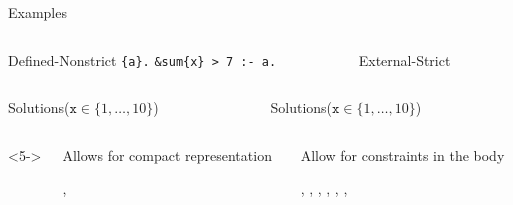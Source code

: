 \documentclass[t,fleqn]{beamer}
\begin{document}
\begin{frame}{Examples}
\vspace{-\baselineskip}%
\begin{columns}[t]
\begin{column}[t]{0.48\linewidth}
\begin{block}{Defined-Nonstrict}
\texttt{\{a\}.}\newline
\texttt{\&sum\{x\} > 7 :- a.}
\end{block}
\end{column}
\begin{column}[t]{0.48\linewidth}
\begin{block}{External-Strict}
\end{block}
\end{column}
\end{columns}
%
\begin{columns}
\begin{column}[t]{0.48\linewidth}
\begin{block}{Solutions\hfill\small ($\mathtt{x}\in\{1,\dots,10\}$)}
%
\end{block}
\end{column}
\begin{column}[t]{0.48\linewidth}
\begin{block}{Solutions\hfill\small ($\mathtt{x}\in\{1,\dots,10\}$)}
\end{block}
\end{column}
\end{columns}
\vspace{\baselineskip}
\begin{columns}<5->
\begin{column}[t]{0.48\linewidth}
Allows for compact representation

\clingo[DL],
\clingo[LP]

\end{column}
\begin{column}[t]{0.48\linewidth}
Allow for constraints in the body

\clingo[DL],
\clingo[LP],
\clingcon, 
\dlvhex[CP],
\inca, 
\dingo, 
\mingo
\end{column}
\end{columns}
\smallskip
{}

\end{frame}
\end{document}
